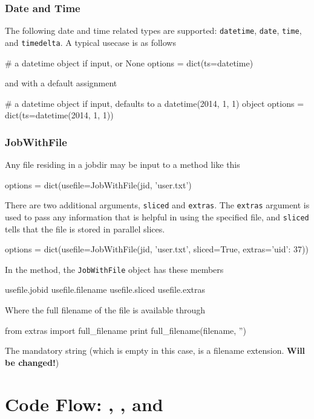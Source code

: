 \subsubsection*{Date and Time}
The following date and time related types are supported:
\texttt{datetime}, \texttt{date}, \texttt{time}, and
\texttt{timedelta}.  A typical usecase is as follows
\begin{pythonBEG}
  # a datetime object if input, or None
  options = dict(ts=datetime)
\end{pythonBEG}
and with a default assignment
\begin{pythonEND}
  #  a datetime object if input, defaults to a datetime(2014, 1, 1) object
  options = dict(ts=datetime(2014, 1, 1))
\end{pythonEND}



\subsubsection*{JobWithFile}
Any file residing in a jobdir may be input to a method like this
\begin{pythonBEG}
  options = dict(usefile=JobWithFile(jid, 'user.txt')
\end{pythonBEG}
There are two additional arguments, \texttt{sliced} and
\texttt{extras}.  The \texttt{extras} argument is used to pass any
information that is helpful in using the specified file, and
\texttt{sliced} tells that the file is stored in parallel slices.
\begin{pythonMID}
options = dict(usefile=JobWithFile(jid, 'user.txt', sliced=True, extras={'uid': 37}))
\end{pythonMID}
In the method, the \texttt{JobWithFile} object has these members
\begin{pythonEND}
  usefile.jobid
  usefile.filename
  usefile.sliced
  usefile.extras
\end{pythonEND}
Where the full filename of the file is available through
\begin{python}
from extras import full_filename
print full_filename(filename, '')
\end{python}
The mandatory string (which is empty in this case, is a filename
extension.  \textbf{Will be changed!})





\newpage
\section{Code Flow:  \prepare, \analysis, and \synthesis}


